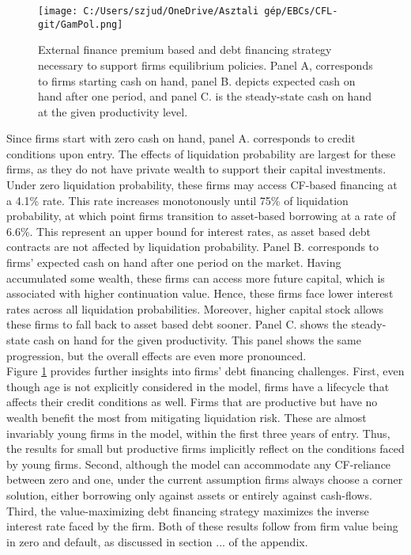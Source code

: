 \documentclass[12pt]{article}
\begin{document}
\begin{figure}[H]  %
    \centering  
    \texttt{[image: C:/Users/szjud/OneDrive/Asztali gép/EBCs/CFL-git/GamPol.png]}
    \caption{ \small External finance premium based and debt financing strategy necessary to support firms equilibrium policies. Panel A, corresponds to firms starting cash on hand, panel B. depicts expected cash on hand after one period, and panel C. is the steady-state cash on hand at the given productivity level.}
    \label{chart:liqprob}
\end{figure}

\noindent Since firms start with zero cash on hand, panel A. corresponds to credit conditions upon entry. The effects of liquidation probability are largest for these firms, as they do not have private wealth to support their capital investments. Under zero liquidation probability, these firms may access CF-based financing at a 4.1\% rate. This rate increases monotonously until 75\% of liquidation probability, at which point firms transition to asset-based borrowing at a rate of 6.6\%. This represent an upper bound for interest rates, as asset based debt contracts are not affected by liquidation probability. Panel B. corresponds to firms' expected cash on hand after one period on the market. Having accumulated some wealth, these firms can access more future capital, which is associated with higher continuation value. Hence, these firms face lower interest rates across all liquidation probabilities. Moreover, higher capital stock allows these firms to fall back to asset based debt sooner. Panel C. shows the steady-state cash on hand for the given productivity. This panel shows the same progression, but the overall effects are even more pronounced. \vspace{3mm} \\
Figure \ref{chart:liqprob} provides further insights into firms' debt financing challenges. First, even though age is not explicitly considered in the model, firms have a lifecycle that affects their credit conditions as well. Firms that are productive but have no wealth benefit the most from mitigating liquidation risk. These are almost invariably young firms in the model, within the first three years of entry. Thus, the results for small but productive firms implicitly reflect on the conditions faced by young firms. Second, although the model can accommodate any CF-reliance between zero and one, under the current assumption firms always choose a corner solution, either borrowing only against assets or entirely against cash-flows. Third, the value-maximizing debt financing strategy maximizes the inverse interest rate faced by the firm. Both of these results follow from firm value being in zero and default, as discussed in section ... of the appendix. 
\end{document}
